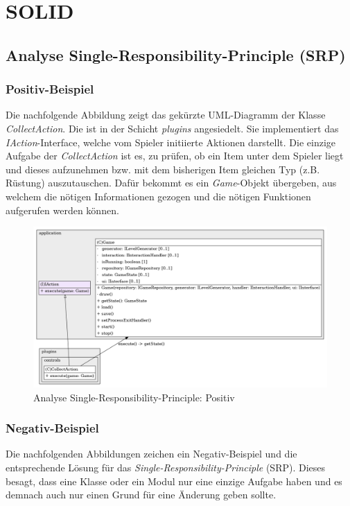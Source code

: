 \chapter{SOLID}

\section{Analyse Single-Responsibility-Principle (SRP)}
\subsection{Positiv-Beispiel}
Die nachfolgende Abbildung zeigt das gekürzte UML-Diagramm der Klasse
\textit{CollectAction}. Die ist in der Schicht \textit{plugins}
angesiedelt. Sie implementiert das \textit{IAction}-Interface, welche
vom Spieler initiierte Aktionen darstellt. Die einzige Aufgabe der
\textit{CollectAction} ist es, zu prüfen, ob ein Item unter dem 
Spieler liegt und dieses aufzunehmen bzw. mit dem bisherigen Item
gleichen Typ (z.B. Rüstung) auszutauschen. Dafür bekommt es ein
\textit{Game}-Objekt übergeben, aus welchem die nötigen Informationen
gezogen und die nötigen Funktionen aufgerufen werden können.

\vspace{0.5cm}
\begin{figure}[H]
    \centering
    \includegraphics[width=1\linewidth]{Bilder/Visualisierung/CollectActionSimplified_structure.png}
    \caption{Analyse Single-Responsibility-Principle: Positiv}
\end{figure}

\subsection{Negativ-Beispiel}
Die nachfolgenden Abbildungen zeichen ein Negativ-Beispiel und die
entsprechende Lösung für das \textit{Single-Responsibility-Principle} (SRP).
Dieses besagt, dass eine Klasse oder ein Modul nur eine einzige
Aufgabe haben und es demnach auch nur einen Grund für eine Änderung
geben sollte.

